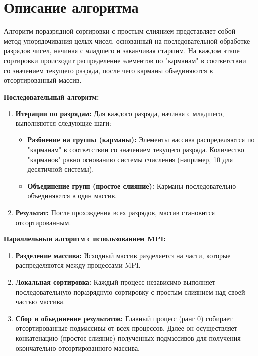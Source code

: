 \documentclass[a4paper, 14pt]{article}
\begin{document}
	
	
	
	\newpage

\section*{\centering Описание алгоритма}

\indent Алгоритм поразрядной сортировки с простым слиянием представляет собой метод упорядочивания целых чисел, основанный на последовательной обработке разрядов чисел, начиная с младшего и заканчивая старшим. На каждом этапе сортировки происходит распределение элементов по "карманам" в соответствии со значением текущего разряда, после чего карманы объединяются в отсортированный массив.

\textbf{Последовательный алгоритм:}
\vspace{-1em}
\begin{enumerate}
    \item \textbf{Итерации по разрядам:} Для каждого разряда, начиная с младшего, выполняются следующие шаги:
    \begin{itemize}
         \item \textbf{Разбиение на группы (карманы):} Элементы массива распределяются по "карманам" в соответствии со значением текущего разряда. Количество "карманов" равно основанию системы счисления (например, 10 для десятичной системы).
        \item \textbf{Объединение групп (простое слияние):}  Карманы последовательно объединяются в один массив.
    \end{itemize}
     \item \textbf{Результат:} После прохождения всех разрядов, массив становится отсортированным.
\end{enumerate}

\textbf{Параллельный алгоритм с использованием MPI:}
\vspace{-1em}
\begin{enumerate}
    \item \textbf{Разделение массива:} Исходный массив разделяется на части, которые распределяются между процессами MPI.
    \item \textbf{Локальная сортировка:} Каждый процесс независимо выполняет последовательную поразрядную сортировку с простым слиянием над своей частью массива.
     \item \textbf{Сбор и объединение результатов:} Главный процесс (ранг 0) собирает отсортированные подмассивы от всех процессов. Далее он осуществляет конкатенацию (простое слияние) полученных подмассивов для получения окончательно отсортированного массива.
\end{enumerate}
\end{document}
